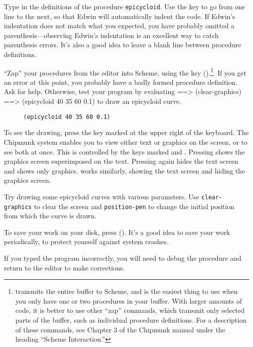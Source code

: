 Type in the definitions of the procedure {\tt epicycloid}.  Use the
 key to go from one line to the next, so that Edwin will
automatically indent the code.  If Edwin's indentation does not match
what you expected, you have probably omitted a parenthesis---observing
Edwin's indentation is an excellent way to catch parenthesis errors.
It's also a good idea to leave a blank line between procedure
definitions.

``Zap'' your procedures from the editor into Scheme, using the
 key ({\shift {}}).\footnote{ transmits the entire buffer to Scheme, and is the easiest thing to use
when you only have one or two procedures in your buffer.  With larger amounts
of code, it is better to use other ``zap'' commands, which transmit only
selected parts of the buffer, such as individual procedure definitions.  For a
description of these commands, see Chapter 3 of the Chipmunk manual under the
heading ``Scheme Interaction.''}.  If you get an error at this point, you
probably have a badly formed procedure definition.  Ask for help.  Otherwise,
test your program by evaluating
\beginlisp
==> (clear-graphics)
\null
==> (epicycloid 40 35 60 0.1)
\endlisp
to draw an epicycloid curve.

\begin{figure}
\vspace{4 in}
\caption{{\tt (epicycloid 40 35 60 0.1)}}
\end{figure}

To see the drawing, press the key marked  at the upper
right of the keyboard.  The Chipmunk system enables you to view either
text or graphics on the screen, or to see both at once.  This is
controlled by the keys marked  and .
Pressing  shows the graphics screen superimposed on the
text.  Pressing  again hides the text screen and shows
only graphics.   works similarly, showing the text screen
and hiding the graphics screen.

Try drawing some epicycloid curves with various parameters.  Use
{\tt clear-graphics} to clear the screen and {\tt position-pen} to change
the initial position from which the curve is drawn.

To save your work on your disk, press { ()}.
It's a good idea to save your work periodically, to protect yourself
against system crashes.


If you typed the program incorrectly, you will need to debug the
procedure and return to the editor to make corrections.

